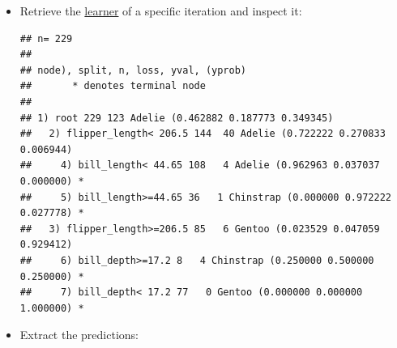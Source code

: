 \documentclass[
]{scrbook}
\newenvironment{Shaded}{\begin{snugshade}}{\end{snugshade}}
\newcommand{\CommentTok}[1]{\textcolor[rgb]{0.56,0.35,0.01}{\textit{#1}}}
\newcommand{\DecValTok}[1]{\textcolor[rgb]{0.00,0.00,0.81}{#1}}
\newcommand{\FunctionTok}[1]{\textcolor[rgb]{0.00,0.00,0.00}{#1}}
\newcommand{\NormalTok}[1]{#1}
\newcommand{\OtherTok}[1]{\textcolor[rgb]{0.56,0.35,0.01}{#1}}
\newcommand{\SpecialCharTok}[1]{\textcolor[rgb]{0.00,0.00,0.00}{#1}}
\renewenvironment{Shaded} {\begin{snugshade}\small} {\end{snugshade}}
\begin{document}
\begin{itemize}
\begin{verbatim}
##  int [1:115] 3 8 12 18 20 21 28 35 38 43 ...
\end{verbatim}

\begin{Shaded}
\end{Shaded}

\begin{verbatim}
##  int [1:229] 2 4 9 10 11 13 14 17 22 23 ...
\end{verbatim}
\item
  Retrieve the \protect\hyperlink{learners}{learner} of a specific iteration and inspect it:

\begin{Shaded}
\end{Shaded}

\begin{verbatim}
## n= 229 
## 
## node), split, n, loss, yval, (yprob)
##       * denotes terminal node
## 
## 1) root 229 123 Adelie (0.462882 0.187773 0.349345)  
##   2) flipper_length< 206.5 144  40 Adelie (0.722222 0.270833 0.006944)  
##     4) bill_length< 44.65 108   4 Adelie (0.962963 0.037037 0.000000) *
##     5) bill_length>=44.65 36   1 Chinstrap (0.000000 0.972222 0.027778) *
##   3) flipper_length>=206.5 85   6 Gentoo (0.023529 0.047059 0.929412)  
##     6) bill_depth>=17.2 8   4 Chinstrap (0.250000 0.500000 0.250000) *
##     7) bill_depth< 17.2 77   0 Gentoo (0.000000 0.000000 1.000000) *
\end{verbatim}
\item
  Extract the predictions:

\begin{Shaded}
\end{Shaded}


\end{itemize}
\end{document}
